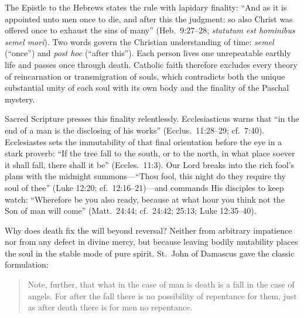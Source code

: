 The Epistle to the Hebrews states the rule with lapidary finality: ``And as it is appointed unto men once to die, and after this the judgment: so also Christ was offered once to exhaust the sins of many'' (Heb.\ 9:27--28; \emph{statutum est hominibus semel mori}). Two words govern the Christian understanding of time: \emph{semel} (``once'') and \emph{post hoc} (``after this''). Each person lives one unrepeatable earthly life and passes once through death. Catholic faith therefore excludes every theory of reincarnation or transmigration of souls, which contradicts both the unique substantial unity of each soul with its own body and the finality of the Paschal mystery.

Sacred Scripture presses this finality relentlessly. Ecclesiasticus warns that ``in the end of a man is the disclosing of his works'' (Ecclus.\ 11:28--29; cf.\ 7:40). Ecclesiastes sets the immutability of that final orientation before the eye in a stark proverb: ``If the tree fall to the south, or to the north, in what place soever it shall fall, there shall it be'' (Eccles.\ 11:3). Our Lord breaks into the rich fool's plans with the midnight summons---``Thou fool, this night do they require thy soul of thee'' (Luke 12:20; cf.\ 12:16--21)---and commands His disciples to keep watch: ``Wherefore be you also ready, because at what hour you think not the Son of man will come'' (Matt.\ 24:44; cf.\ 24:42; 25:13; Luke 12:35--40).

Why does death fix the will beyond reversal? Neither from arbitrary impatience nor from any defect in divine mercy, but because leaving bodily mutability places the soul in the stable mode of pure spirit. St.~John of Damascus gave the classic formulation:

\begin{quote}
Note, further, that what in the case of man is death is a fall in the case of angels. For after the fall there is no possibility of repentance for them, just as after death there is for men no repentance.
\end{quote}

